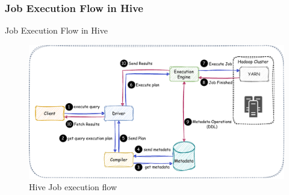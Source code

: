 \subsubsection{Job Execution Flow in Hive}
\begin{frame}{Job Execution Flow in Hive}
	\vspace{-0.8cm}
\begin{figure}
	\includegraphics[width=\textwidth,height=\textheight,keepaspectratio]{./Figures/chapter-03/Hive_Query_Flow.pdf}
	\caption{Hive Job execution flow}
\end{figure}


	\end{frame}


